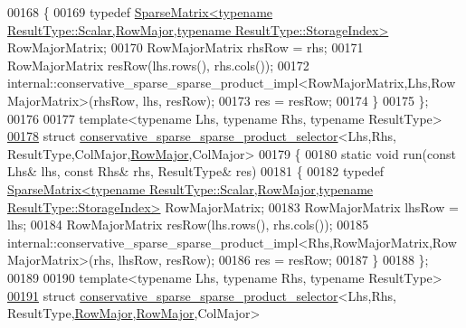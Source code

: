 \begin{DoxyCode}
00168   \{
00169      \textcolor{keyword}{typedef} 
      \hyperlink{group___sparse_core___module_class_eigen_1_1_sparse_matrix}{SparseMatrix<typename ResultType::Scalar,RowMajor,typename ResultType::StorageIndex>}
       RowMajorMatrix;
00170      RowMajorMatrix rhsRow = rhs;
00171      RowMajorMatrix resRow(lhs.rows(), rhs.cols());
00172      internal::conservative\_sparse\_sparse\_product\_impl<RowMajorMatrix,Lhs,RowMajorMatrix>(rhsRow, lhs, 
      resRow);
00173      res = resRow;
00174   \}
00175 \};
00176 
00177 \textcolor{keyword}{template}<\textcolor{keyword}{typename} Lhs, \textcolor{keyword}{typename} Rhs, \textcolor{keyword}{typename} ResultType>
\hyperlink{struct_eigen_1_1internal_1_1conservative__sparse__sparse__product__selector_3_01_lhs_00_01_rhs_0d6546946ae9a7e5a4739479fa99718a1}{00178} \textcolor{keyword}{struct }\hyperlink{struct_eigen_1_1internal_1_1conservative__sparse__sparse__product__selector}{conservative\_sparse\_sparse\_product\_selector}<Lhs,Rhs,
      ResultType,ColMajor,\hyperlink{group__enums_ggaacded1a18ae58b0f554751f6cdf9eb13acfcde9cd8677c5f7caf6bd603666aae3}{RowMajor},ColMajor>
00179 \{
00180   \textcolor{keyword}{static} \textcolor{keywordtype}{void} run(\textcolor{keyword}{const} Lhs& lhs, \textcolor{keyword}{const} Rhs& rhs, ResultType& res)
00181   \{
00182     \textcolor{keyword}{typedef} 
      \hyperlink{group___sparse_core___module_class_eigen_1_1_sparse_matrix}{SparseMatrix<typename ResultType::Scalar,RowMajor,typename ResultType::StorageIndex>}
       RowMajorMatrix;
00183     RowMajorMatrix lhsRow = lhs;
00184     RowMajorMatrix resRow(lhs.rows(), rhs.cols());
00185     internal::conservative\_sparse\_sparse\_product\_impl<Rhs,RowMajorMatrix,RowMajorMatrix>(rhs, lhsRow, 
      resRow);
00186     res = resRow;
00187   \}
00188 \};
00189 
00190 \textcolor{keyword}{template}<\textcolor{keyword}{typename} Lhs, \textcolor{keyword}{typename} Rhs, \textcolor{keyword}{typename} ResultType>
\hyperlink{struct_eigen_1_1internal_1_1conservative__sparse__sparse__product__selector_3_01_lhs_00_01_rhs_09c6df8c1cfe8f5011ca309f86919cf1f}{00191} \textcolor{keyword}{struct }\hyperlink{struct_eigen_1_1internal_1_1conservative__sparse__sparse__product__selector}{conservative\_sparse\_sparse\_product\_selector}<Lhs,Rhs,
      ResultType,\hyperlink{group__enums_ggaacded1a18ae58b0f554751f6cdf9eb13acfcde9cd8677c5f7caf6bd603666aae3}{RowMajor},\hyperlink{group__enums_ggaacded1a18ae58b0f554751f6cdf9eb13acfcde9cd8677c5f7caf6bd603666aae3}{RowMajor},ColMajor>

\end{DoxyCode}
